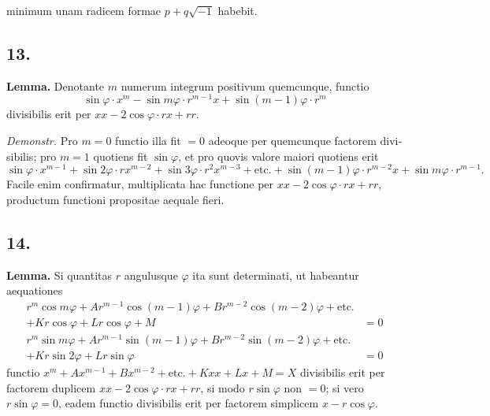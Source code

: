 \documentclass[12pt,a4paper]{article}
\begin{document}
\begin{otherlanguage}{latin}
minimum unam radicem formae $p+q\sqrt{-1}$ habebit.

\subsection*{13.}
\textbf{Lemma.} Denotante $m$ numerum integrum positivum quemcunque, functio
\[\sin\varphi\cdot x^{m}-\sin m\varphi\cdot r^{m-1}x+\sin(m-1)\varphi\cdot r^{m}\]
divisibilis erit per $xx-2\cos\varphi\cdot rx+rr$.

\textit{Demonstr.} Pro $m=0$ functio illa fit $=0$ adeoque per quemcunque factorem divisibilis; pro $m=1$ quotiens fit $\sin\varphi$, et pro quovis valore maiori quotiens erit
\[\sin\varphi\cdot x^{m-1}+\sin2\varphi\cdot rx^{m-2}+\sin3\varphi\cdot r^{2}x^{m-3}+\text{etc.}+\sin(m-1)\varphi\cdot r^{m-2}x+\sin m\varphi\cdot r^{m-1}.\]
Facile enim confirmatur, multiplicata hac functione per $xx-2\cos\varphi\cdot rx+rr$, productum functioni propositae aequale fieri.

\subsection*{14.}
\textbf{Lemma.} Si quantitas $r$ angulusque $\varphi$ ita sunt determinati, ut habeantur aequationes
\begin{align*}
r^{m}\cos m\varphi+Ar^{m-1}\cos(m-1)\varphi+Br^{m-2}\cos(m-2)\varphi+\text{etc.}\\
+Kr\cos\varphi+Lr\cos\varphi+M&=0 \tag{1}\\
r^{m}\sin m\varphi+Ar^{m-1}\sin(m-1)\varphi+Br^{m-2}\sin(m-2)\varphi+\text{etc.}\\
+Kr\sin2\varphi+Lr\sin\varphi&=0 \tag{2}
\end{align*}
functio $x^{m}+Ax^{m-1}+Bx^{m-2}+\text{etc.}+Kxx+Lx+M=X$ divisibilis erit per factorem duplicem $xx-2\cos\varphi\cdot rx+rr$, si modo $r\sin\varphi$ non $=0$; si vero $r\sin\varphi=0$, eadem functio divisibilis erit per factorem simplicem $x-r\cos\varphi$.


\end{otherlanguage}
\end{document}
